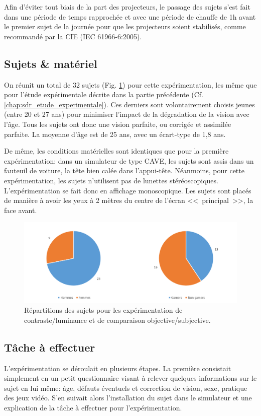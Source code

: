 	\par Afin d'éviter tout biais de la part des projecteurs, le passage des sujets s'est fait dans une période de temps rapprochée et avec une période de chauffe de 1h avant le premier sujet de la journée pour que les projecteurs soient stabilisés, comme recommandé par la CIE (IEC 61966-6:2005).
	
	\subsection{Sujets \& matériel}
	\par On réunit un total de 32 sujets (Fig. \ref{fig:expe_sujets}) pour cette expérimentation, les même que pour l'étude expérimentale décrite dans la partie précédente (Cf.  \ref{chap:sdr_etude_experimentale}). Ces derniers sont volontairement choisis jeunes (entre 20 et 27 ans) pour minimiser l'impact de la dégradation de la vision avec l'âge. Tous les sujets ont donc une vision parfaite, ou corrigée et assimilée parfaite. La moyenne d'âge est de 25 ans, avec un écart-type de 1,8 ans.
	
	\par De même, les conditions matérielles sont identiques que pour la première expérimentation: dans un simulateur de type CAVE, les sujets sont assis dans un fauteuil de voiture, la tête bien calée dans l'appui-tête. Néanmoins, pour cette expérimentation, les sujets n'utilisent pas de lunettes stéréoscopiques. L'expérimentation se fait donc en affichage monoscopique. Les sujets sont placés de manière à avoir les yeux à 2 mètres du centre de l'écran <<~principal~>>, la face avant.
	
	\begin{figure}
		\centering
		\includegraphics[scale=0.8]{Figures/SubjectsCharts}
		\caption{Répartitions des sujets pour les expérimentation de contraste/luminance et de comparaison objective/subjective.}
		\label{fig:expe_sujets}
	\end{figure}
	
	\subsection{Tâche à effectuer}
	\par L'expérimentation se déroulait en plusieurs étapes. La première consistait simplement en un petit questionnaire visant à relever quelques informations sur le sujet en lui même: âge, défauts éventuels et correction de vision, sexe, pratique des jeux vidéo. S'en suivait alors l'installation du sujet dans le simulateur et une explication de la tâche à effectuer pour l'expérimentation.
	
